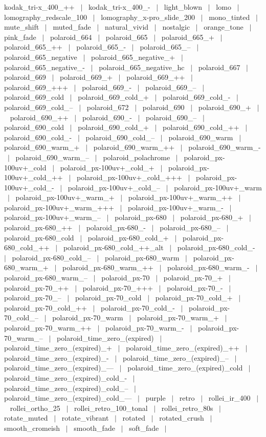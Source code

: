 \documentclass[a4paper,10.5pt,twoside]{book}
\begin{document}
kodak\_tri-x\_400\_++ ~$|$~ kodak\_tri-x\_400\_- ~$|$~ light\_blown ~$|$~ lomo ~$|$~ lomography\_redscale\_100 ~$|$~ lomography\_x-pro\_slide\_200 ~$|$~ mono\_tinted ~$|$~ mute\_shift ~$|$~ muted\_fade ~$|$~ natural\_vivid ~$|$~ nostalgic ~$|$~ orange\_tone ~$|$~ pink\_fade ~$|$~ polaroid\_664 ~$|$~ polaroid\_665 ~$|$~ polaroid\_665\_+ ~$|$~ polaroid\_665\_++ ~$|$~ polaroid\_665\_- ~$|$~ polaroid\_665\_-- ~$|$~ polaroid\_665\_negative ~$|$~ polaroid\_665\_negative\_+ ~$|$~ polaroid\_665\_negative\_- ~$|$~ polaroid\_665\_negative\_hc ~$|$~ polaroid\_667 ~$|$~ polaroid\_669 ~$|$~ polaroid\_669\_+ ~$|$~ polaroid\_669\_++ ~$|$~ polaroid\_669\_+++ ~$|$~ polaroid\_669\_- ~$|$~ polaroid\_669\_-- ~$|$~ polaroid\_669\_cold ~$|$~ polaroid\_669\_cold\_+ ~$|$~ polaroid\_669\_cold\_- ~$|$~ polaroid\_669\_cold\_-- ~$|$~ polaroid\_672 ~$|$~ polaroid\_690 ~$|$~ polaroid\_690\_+ ~$|$~ polaroid\_690\_++ ~$|$~ polaroid\_690\_- ~$|$~ polaroid\_690\_-- ~$|$~ polaroid\_690\_cold ~$|$~ polaroid\_690\_cold\_+ ~$|$~ polaroid\_690\_cold\_++ ~$|$~ polaroid\_690\_cold\_- ~$|$~ polaroid\_690\_cold\_-- ~$|$~ polaroid\_690\_warm ~$|$~ polaroid\_690\_warm\_+ ~$|$~ polaroid\_690\_warm\_++ ~$|$~ polaroid\_690\_warm\_- ~$|$~ polaroid\_690\_warm\_-- ~$|$~ polaroid\_polachrome ~$|$~ polaroid\_px-100uv+\_cold ~$|$~ polaroid\_px-100uv+\_cold\_+ ~$|$~ polaroid\_px-100uv+\_cold\_++ ~$|$~ polaroid\_px-100uv+\_cold\_+++ ~$|$~ polaroid\_px-100uv+\_cold\_- ~$|$~ polaroid\_px-100uv+\_cold\_-- ~$|$~ polaroid\_px-100uv+\_warm ~$|$~ polaroid\_px-100uv+\_warm\_+ ~$|$~ polaroid\_px-100uv+\_warm\_++ ~$|$~ polaroid\_px-100uv+\_warm\_+++ ~$|$~ polaroid\_px-100uv+\_warm\_- ~$|$~ polaroid\_px-100uv+\_warm\_-- ~$|$~ polaroid\_px-680 ~$|$~ polaroid\_px-680\_+ ~$|$~ polaroid\_px-680\_++ ~$|$~ polaroid\_px-680\_- ~$|$~ polaroid\_px-680\_-- ~$|$~ polaroid\_px-680\_cold ~$|$~ polaroid\_px-680\_cold\_+ ~$|$~ polaroid\_px-680\_cold\_++ ~$|$~ polaroid\_px-680\_cold\_++\_alt ~$|$~ polaroid\_px-680\_cold\_- ~$|$~ polaroid\_px-680\_cold\_-- ~$|$~ polaroid\_px-680\_warm ~$|$~ polaroid\_px-680\_warm\_+ ~$|$~ polaroid\_px-680\_warm\_++ ~$|$~ polaroid\_px-680\_warm\_- ~$|$~ polaroid\_px-680\_warm\_-- ~$|$~ polaroid\_px-70 ~$|$~ polaroid\_px-70\_+ ~$|$~ polaroid\_px-70\_++ ~$|$~ polaroid\_px-70\_+++ ~$|$~ polaroid\_px-70\_- ~$|$~ polaroid\_px-70\_-- ~$|$~ polaroid\_px-70\_cold ~$|$~ polaroid\_px-70\_cold\_+ ~$|$~ polaroid\_px-70\_cold\_++ ~$|$~ polaroid\_px-70\_cold\_- ~$|$~ polaroid\_px-70\_cold\_-- ~$|$~ polaroid\_px-70\_warm ~$|$~ polaroid\_px-70\_warm\_+ ~$|$~ polaroid\_px-70\_warm\_++ ~$|$~ polaroid\_px-70\_warm\_- ~$|$~ polaroid\_px-70\_warm\_-- ~$|$~ polaroid\_time\_zero\_(expired) ~$|$~ polaroid\_time\_zero\_(expired)\_+ ~$|$~ polaroid\_time\_zero\_(expired)\_++ ~$|$~ polaroid\_time\_zero\_(expired)\_- ~$|$~ polaroid\_time\_zero\_(expired)\_-- ~$|$~ polaroid\_time\_zero\_(expired)\_--- ~$|$~ polaroid\_time\_zero\_(expired)\_cold ~$|$~ polaroid\_time\_zero\_(expired)\_cold\_- ~$|$~ polaroid\_time\_zero\_(expired)\_cold\_-- ~$|$~ polaroid\_time\_zero\_(expired)\_cold\_--- ~$|$~ purple ~$|$~ retro ~$|$~ rollei\_ir\_400 ~$|$~ rollei\_ortho\_25 ~$|$~ rollei\_retro\_100\_tonal ~$|$~ rollei\_retro\_80s ~$|$~ rotate\_muted ~$|$~ rotate\_vibrant ~$|$~ rotated ~$|$~ rotated\_crush ~$|$~ smooth\_cromeish ~$|$~ smooth\_fade ~$|$~ soft\_fade ~$|$~ 
\end{document}
